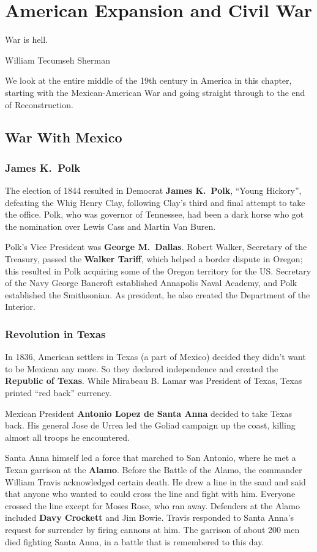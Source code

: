 \chapter{American Expansion and Civil War}

\epigraph{%
  War is hell.
}{William Tecumseh Sherman}

We look at the entire middle of the 19th century in America in this chapter,
starting with the Mexican-American War and going straight through to the end of Reconstruction.

\section{War With Mexico}

\subsection*{James K.\ Polk}

The election of 1844 resulted in Democrat \textbf{James K.\ Polk}, ``Young Hickory'', defeating the Whig Henry Clay,
following Clay's third and final attempt to take the office.
Polk, who was governor of Tennessee, had been a dark horse who got the nomination over Lewis Cass and Martin Van Buren.

Polk's Vice President was \textbf{George M.\ Dallas}.
Robert Walker, Secretary of the Treasury, passed the \textbf{Walker Tariff},
which helped a border dispute in Oregon;
this resulted in Polk acquiring some of the Oregon territory for the US\@.
Secretary of the Navy George Bancroft established Annapolis Naval Academy,
and Polk established the Smithsonian.
As president, he also created the Department of the Interior.

\subsection*{Revolution in Texas}

In 1836, American settlers in Texas (a part of Mexico) decided they didn't want to be Mexican any more.
So they declared independence and created the \textbf{Republic of Texas}.
While Mirabeau B. Lamar was President of Texas, Texas printed ``red back'' currency.

Mexican President \textbf{Antonio Lopez de Santa Anna} decided to take Texas back.
His general Jose de Urrea led the Goliad campaign up the coast, killing almost all troops he encountered.

Santa Anna himself led a force that marched to San Antonio, where he met a Texan garrison at the \textbf{Alamo}.
Before the Battle of the Alamo, the commander William Travis acknowledged certain death.
He drew a line in the sand and said that anyone who wanted to could cross the line and fight with him.
Everyone crossed the line except for Moses Rose, who ran away.
Defenders at the Alamo included \textbf{Davy Crockett} and Jim Bowie.
Travis responded to Santa Anna's request for surrender by firing cannons at him.
The garrison of about 200 men died fighting Santa Anna, in a battle that is remembered to this day.

